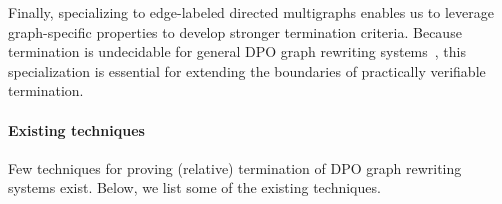 
Finally, specializing to edge-labeled directed multigraphs enables us to leverage graph-specific properties to develop stronger termination criteria. Because termination is undecidable for general DPO graph rewriting systems~\cite{plump1998terminationundecidable}, this specialization is essential for extending the boundaries of practically verifiable termination. 

\paragraph{Existing techniques}
Few techniques for proving (relative) termination of DPO graph rewriting systems exist. Below, we list some of the existing techniques.

